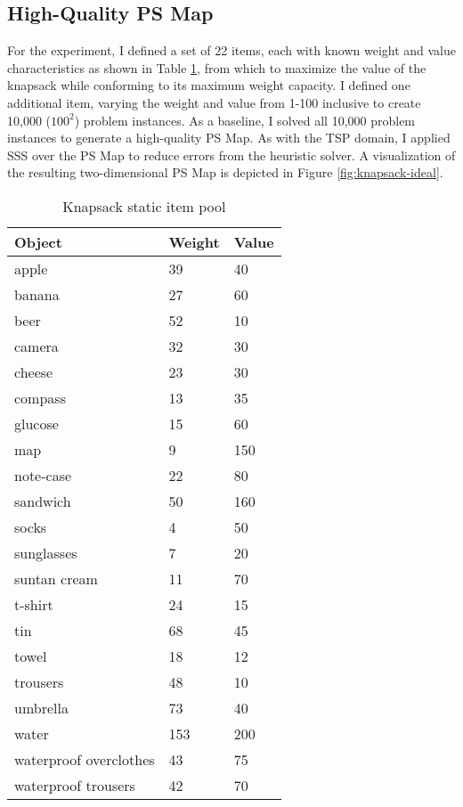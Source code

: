 \subsection{High-Quality PS Map} For the  experiment, I defined a set of 22 items, each with known weight and value characteristics as shown in Table \ref{tab:knapsack-item-pool}, from which to maximize the value of the knapsack while conforming to its maximum weight capacity.  I defined one additional item, varying the weight and value from 1-100 inclusive to create 10,000 ($\textrm{100}^{\textrm{2}}$) problem instances.  As a baseline, I solved all 10,000 problem instances to generate a high-quality PS Map.  As with the TSP domain, I applied SSS over the PS Map to reduce errors from the heuristic solver.  A visualization of the resulting two-dimensional PS Map is depicted in Figure \ref{fig:knapsack-ideal}.


\begin{table}
\begin{center}
  \begin{tabular}{|p{5cm}|p{1.5cm}|p{1.5cm}|}
    \hline
    \textbf{Object} & \textbf{Weight} & \textbf{Value} \\ \hline
    apple & 39 & 40 \\ \hline
    banana & 27 & 60 \\ \hline
    beer & 52 & 10 \\ \hline
    camera & 32 & 30 \\ \hline
    cheese & 23 & 30 \\ \hline
    compass & 13 & 35 \\ \hline
    glucose & 15 & 60 \\ \hline
    map & 9 & 150 \\ \hline
    note-case & 22 & 80 \\ \hline
    sandwich & 50 & 160 \\ \hline
    socks & 4 & 50 \\ \hline
    sunglasses & 7 & 20 \\ \hline
    suntan cream & 11 & 70 \\ \hline
    t-shirt & 24 & 15 \\ \hline
    tin & 68 & 45 \\ \hline
    towel & 18 & 12 \\ \hline
    trousers & 48 & 10 \\ \hline
    umbrella & 73 & 40 \\ \hline
    water & 153 & 200 \\ \hline
    waterproof overclothes & 43 & 75 \\ \hline
    waterproof trousers & 42 & 70 \\
    \hline
  \end{tabular}
  \caption{Knapsack static item pool}
  \label{tab:knapsack-item-pool}
\end{center}
\end{table}


